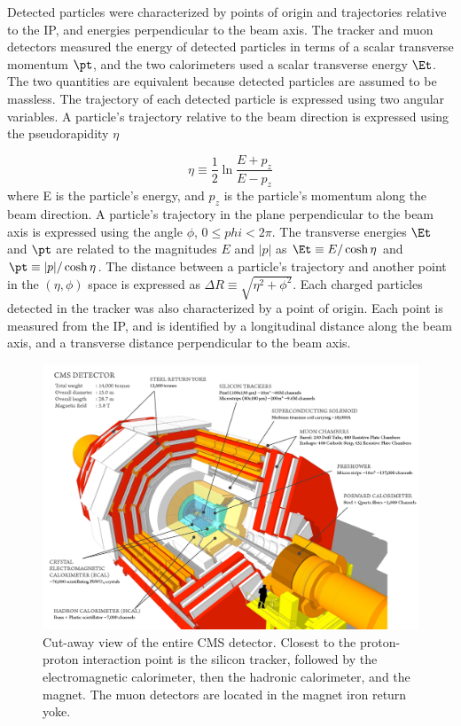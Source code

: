 Detected particles were characterized by points of origin and trajectories relative to the IP, and energies 
perpendicular to the beam axis.  The tracker and muon detectors measured the energy of detected particles in 
terms of a scalar transverse momentum $\pt$, and the two calorimeters used a scalar transverse energy $\Et$.  The two 
quantities are equivalent because detected particles are assumed to be massless.  The trajectory of each detected particle 
is expressed using two angular variables.  A particle's trajectory relative to the beam direction is expressed using 
the pseudorapidity $\eta$

\begin{equation}
	\eta \equiv \frac{1}{2}\ln{\frac{E+p_{z}}{E-p_{z}}}
\end{equation}
where E is the particle's energy, and $p_{z}$ is the particle's momentum along the beam direction.  A particle's 
trajectory in the plane perpendicular to the beam axis is expressed using the angle $\phi$, $0 \leq phi < 2\pi$.  The 
transverse energies $\Et$ and $\pt$ are related to the magnitudes $E$ and $|p|$ as $\Et \equiv E/\cosh{\eta}$ and 
$\pt \equiv |p|/\cosh{\eta}$.  The distance between a particle's trajectory and another point in the $(\eta,\phi)$ 
space is expressed as $\Delta R \equiv \sqrt{\eta^{2} + \phi^{2}}$.  Each charged particles detected in the tracker 
was also characterized by a point of origin.  Each point is measured from the IP, and 
is identified by a longitudinal distance along the beam axis, and a transverse distance perpendicular to the beam axis.

\begin{figure}[h]
	\centering
	\includegraphics[width=1\textwidth]{figures/cmsDetectorBasic.png}
	\caption{Cut-away view of the entire CMS detector.  Closest to the proton-proton interaction point is the 
		silicon tracker, followed by the electromagnetic calorimeter, then the hadronic calorimeter, and the 
	magnet.  The muon detectors are located in the magnet iron return yoke.}
	\label{fig:layersOfCMS}
\end{figure}


